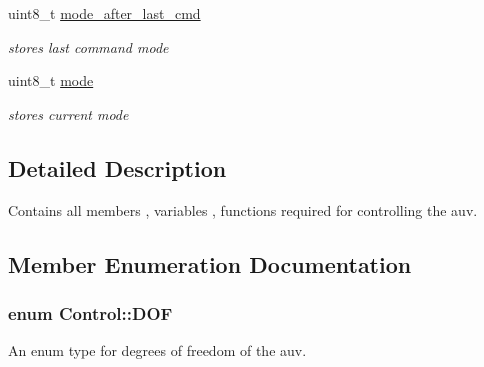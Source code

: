 \begin{DoxyCompactItemize}
\item 
uint8\+\_\+t \hyperlink{classControl_a8775fce3fa356ec18f05a199e2e018c4}{mode\+\_\+after\+\_\+last\+\_\+cmd}
\begin{DoxyCompactList}\small\item\em stores last command mode \end{DoxyCompactList}\item 
uint8\+\_\+t \hyperlink{classControl_ad55ea3c85c8b2d428e7c9a6d92c80f25}{mode}
\begin{DoxyCompactList}\small\item\em stores current mode \end{DoxyCompactList}\end{DoxyCompactItemize}


\subsection{Detailed Description}
Contains all members , variables , functions required for controlling the auv. 

\subsection{Member Enumeration Documentation}
\subsubsection[{\texorpdfstring{D\+OF}{DOF}}]{\setlength{\rightskip}{0pt plus 5cm}enum {\bf Control\+::\+D\+OF}\hspace{0.3cm}{\ttfamily [private]}}\hypertarget{classControl_a6cb75f414551e72f7836047be8ce6ef3}{}\label{classControl_a6cb75f414551e72f7836047be8ce6ef3}


An enum type for degrees of freedom of the auv. 

